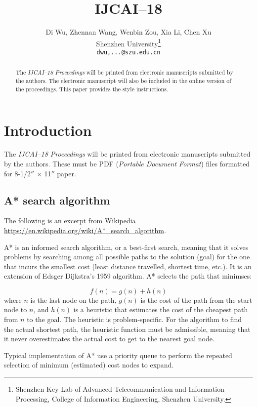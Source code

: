 \documentclass{article}
\title{IJCAI--18}
\author{Di Wu, Zhennan Wang, Wenbin Zou, Xia Li, Chen Xu\\
Shenzhen University\thanks{Shenzhen Key Lab of Advanced Telecommunication and Information Processing, College of Information Engineering, Shenzhen University.}\\
{\tt\small dwu,...@szu.edu.cn}}
\begin{document}
\maketitle

\begin{abstract}
  The {\it IJCAI--18 Proceedings} will be printed from electronic
  manuscripts submitted by the authors. The electronic manuscript will
  also be included in the online version of the proceedings. This paper
  provides the style instructions.
\end{abstract}

\section{Introduction}

The {\it IJCAI--18 Proceedings} will be printed from electronic
manuscripts submitted by the authors. These must be PDF ({\em Portable
Document Format}) files formatted for 8-1/2$''$ $\times$ 11$''$ paper.



\subsection{A* search algorithm}

The following is an excerpt from Wikipedia \url{https://en.wikipedia.org/wiki/A*_search_algorithm}.

A* is an informed search algorithm, or a best-first search, meaning that it solves problems by searching among all possible paths to the solution (goal) for the one that incurs the smallest cost (least distance travelled, shortest time, etc.). It is an extension of Edsger Dijkstra's 1959 algorithm. A* selects the path that minimses:

\begin{equation}
f(n) = g(n) + h(n)
\end{equation}
where $n$ is the last node on the path, $g(n)$ is the cost of the path from the start node to $n$, and $h(n)$ is a heuristic that estimates the cost of the cheapest path from $n$ to the goal.
The heuristic is problem-specific. For the algorithm to find the actual shortest path, the heuristic function must be admissible, meaning that it never overestimates the actual cost to get to the nearest goal node.

Typical implementation of A* use a priority queue to perform the repeated selection of minimum (estimated) cost nodes to expand.
\end{document}
